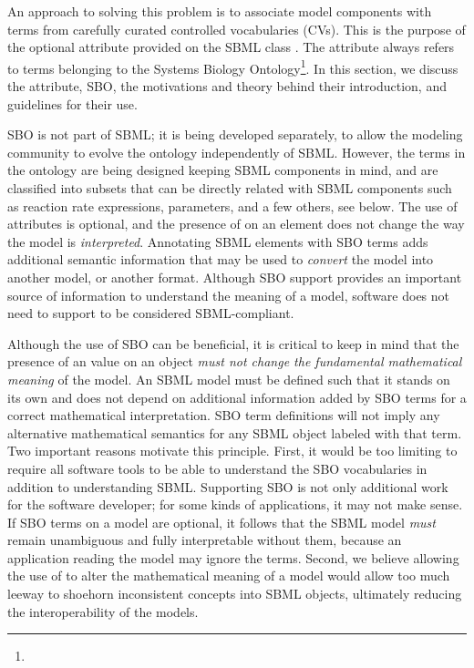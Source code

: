 An approach to solving this problem is to associate model components with terms from carefully curated controlled vocabularies (CVs).  This is the purpose of the optional  attribute provided on the SBML class \SBase.  The  attribute always refers to terms belonging to the Systems Biology Ontology\footnote{\sboref}. In this section, we discuss the  attribute, SBO, the motivations and theory behind their introduction, and guidelines for their use.

SBO is not part of SBML; it is being developed separately, to allow the modeling community to evolve the ontology independently of SBML.  However, the terms in the ontology are being designed keeping SBML components in mind, and are classified into subsets that can be directly related with SBML components such as reaction rate expressions, parameters, and a few others, see below.  The use of  attributes is optional, and the presence of  on an element does not change the way the model is \emph{interpreted}.  Annotating SBML elements with SBO terms adds additional semantic information that may be used to \emph{convert} the model into another model, or another format. Although SBO support provides an important source of information to understand the meaning of a model, software does not need to support  to be considered SBML-compliant.

Although the use of SBO can be beneficial, it is critical to keep in mind that the presence of an  value on an object \emph{must not change the fundamental mathematical meaning} of the model.  An SBML model must be defined such that it stands on its own and does not depend on additional information added by SBO terms for a correct mathematical interpretation.  SBO term definitions will not imply any alternative mathematical semantics for any SBML object labeled with that term.  Two important reasons motivate this principle.  First, it would be too limiting to require all software tools to be able to understand the SBO vocabularies in addition to understanding SBML. Supporting SBO is not only additional work for the software developer; for some kinds of applications, it may not make sense. If SBO terms on a model are optional, it follows that the SBML model \emph{must} remain unambiguous and fully interpretable without them, because an application reading the model may ignore the terms.  Second, we believe allowing the use of  to alter the mathematical meaning of a model would allow too much leeway to shoehorn inconsistent concepts into SBML objects, ultimately reducing the interoperability of the models.

